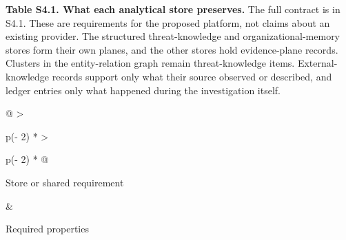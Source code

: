 \documentclass[
  11pt,
]{article}
\renewcommand{\arraystretch}{1.12}
\begin{document}
\begin{table}[tp]
\textbf{Table S4.1. What each analytical store preserves.} The full
contract is in S4.1. These are requirements for the proposed platform,
not claims about an existing provider. The structured threat-knowledge
and organizational-memory stores form their own planes, and the other
stores hold evidence-plane records. Clusters in the entity-relation
graph remain threat-knowledge items. External-knowledge records support
only what their source observed or described, and ledger entries only
what happened during the investigation itself.\par
{\small\renewcommand{\arraystretch}{1.04}
\begin{tabular}{@{}
  >{\raggedright\arraybackslash}p{(\columnwidth - 2\tabcolsep) * }
  >{\raggedright\arraybackslash}p{(\columnwidth - 2\tabcolsep) * }@{}}
\toprule\noalign{}
\begin{minipage}[b]{\linewidth}\raggedright
Store or shared requirement
\end{minipage} & \begin{minipage}[b]{\linewidth}\raggedright
Required properties
\end{minipage} \\
\midrule\noalign{}


\end{tabular}}
\end{table}
\end{document}
